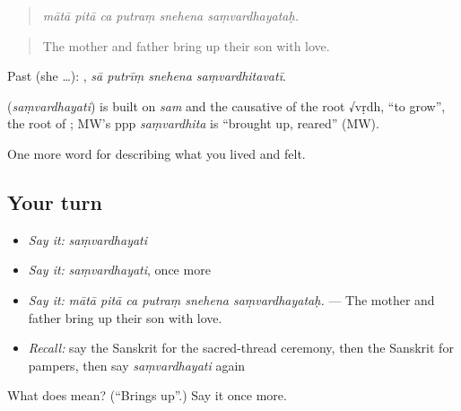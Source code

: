 \begin{quote}
     
\end{quote}

\begin{quote}
\emph{mātā pitā ca putraṃ snehena saṃvardhayataḥ.}
\end{quote}

\begin{quote}
The mother and father bring up their son with love.
\end{quote}

Past (she …):    , \emph{sā putrīṃ snehena saṃvardhitavatī}.

\begin{cousinweb}
\textbf{} (\emph{saṃvardhayati}) is built on \emph{sam} and the causative of the root √vṛdh, \textquotedblleft{}to grow\textquotedblright{}, the root of \textbf{}; MW's ppp \emph{saṃvardhita} is \textquotedblleft{}brought up, reared\textquotedblright{} (MW).
\end{cousinweb}

\begin{grammarlens}[title={What you've built}]
One more word for describing what you lived and felt.
\end{grammarlens}

\subsection*{Your turn}
\begin{itemize}
\raggedright
  \item \emph{Say it:} \emph{saṃvardhayati}
  \item \emph{Say it:} \emph{saṃvardhayati}, once more
  \item \emph{Say it:} \emph{mātā pitā ca putraṃ snehena saṃvardhayataḥ.} — The mother and father bring up their son with love.
  \item \emph{Recall:} say the Sanskrit for the sacred-thread ceremony, then the Sanskrit for pampers, then say \emph{saṃvardhayati} again
\end{itemize}

\begin{tcolorbox}[breakable,colback=teal!4,colframe=teal!35!black,title={Before you move on}]
What does  mean? (\textquotedblleft{}Brings up\textquotedblright{}.) Say it once more.
\end{tcolorbox}
